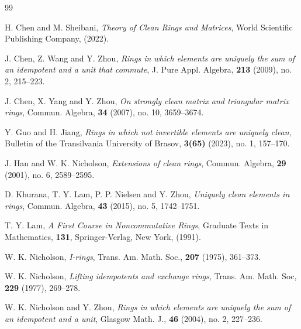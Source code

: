\documentclass[12pt]{amsart}
\theoremstyle{definition}
\begin{document}
\begin{thebibliography}{99}

H. Chen and M. Sheibani, {\it Theory of Clean Rings and Matrices}, World Scientific Publishing Company, (2022).	
	
J. Chen, Z. Wang and Y. Zhou, {\it Rings in which elements are uniquely the sum of an idempotent and a unit that commute}, J. Pure Appl. Algebra, {\bf 213} (2009), no. 2, 215--223.

J. Chen, X. Yang and Y. Zhou, {\it On strongly clean matrix and triangular matrix rings}, Commun. Algebra, {\bf 34} (2007), no. 10, 3659--3674.

Y. Guo and H. Jiang, {\it Rings in which not invertible elements are uniquely clean}, Bulletin of the Transilvania University of Brasov, {\bf 3(65)} (2023), no. 1, 157--170.

J. Han and W. K. Nicholson, {\it Extensions of clean rings}, Commun. Algebra, {\bf 29} (2001), no. 6, 2589--2595.

D. Khurana, T. Y. Lam, P. P. Nielsen and Y. Zhou, {\it Uniquely clean elements in rings}, Commun. Algebra, {\bf 43} (2015), no. 5, 1742--1751.

T. Y. Lam, {\it A First Course in Noncommutative Rings}, Graduate Texts in Mathematics, {\bf 131}, Springer-Verlag, New York, (1991).

W. K. Nicholson, {\it I-rings}, Trans. Am. Math. Soc., {\bf 207} (1975), 361--373.

W. K. Nicholson, {\it Lifting idempotents and exchange rings}, Trans. Am. Math. Soc, {\bf 229} (1977), 269--278.	

W. K. Nicholson and Y. Zhou, {\it Rings in which elements are uniquely the sum of an idempotent and a unit}, Glasgow Math. J., {\bf 46} (2004), no. 2, 227--236.

\end{thebibliography}
\end{document}
